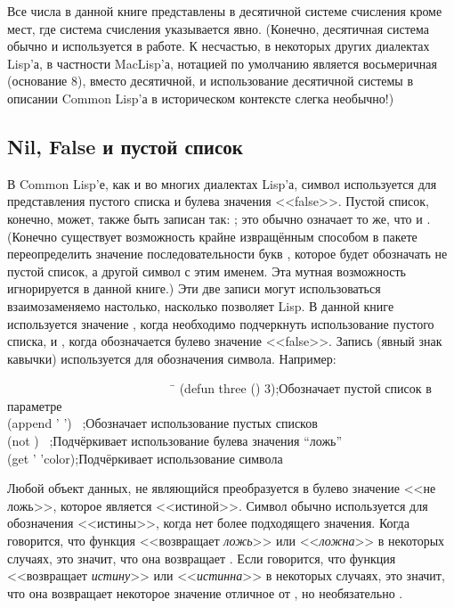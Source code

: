 Все числа в данной книге представлены в десятичной системе счисления кроме мест,
где система счисления указывается явно. 
(Конечно, десятичная система обычно и используется в работе.
К несчастью, в некоторых других диалектах Lisp'а, в частности MacLisp'а,
нотацией по умолчанию является восьмеричная (основание 8), вместо десятичной, и
использование десятичной системы в описании Common Lisp'а в историческом
контексте слегка необычно!) 

\subsection{Nil, False и пустой список}

В Common Lisp'е, как и во многих диалектах Lisp'а, символ  используется
для представления пустого списка и булева значения <<false>>. Пустой список,
конечно, может, также быть записан так: \cd{()}; это обычно означает то же, что
и .
(Конечно существует возможность крайне извращённым способом в пакете
переопределить значение последовательности букв , которое будет 
обозначать не пустой список, а другой символ с этим именем. Эта мутная
возможность игнорируется в данной книге.)
Эти две записи могут использоваться взаимозаменяемо настолько, насколько
позволяет Lisp. В данной книге используется значение {\emptylist}, когда необходимо
подчеркнуть использование пустого списка, и {\false}, когда обозначается булево
значение <<false>>. Запись  (явный знак кавычки) используется для
обозначения символа.
Например:
\begin{lisp}
~~~~~~~~~~~~~~~~~~~~~~~~~~~\=\kill
(defun three () 3)\>;\textrm{Обозначает пустой список в параметре} \\
(append '{\emptylist} '{\emptylist}) \EV\ {\emptylist}\>;\textrm{Обозначает использование
пустых списков} \\
(not {\false}) \EV\ {\true}\>;\textrm{Подчёркивает использование булева значения ``ложь''} \\
(get '{\nil} 'color)\>;\textrm{Подчёркивает использование символа}
\end{lisp}

Любой объект данных, не являющийся {\false} преобразуется в булево значение
<<не ложь>>, которое является <<истиной>>. Символ {\true} обычно используется для
обозначения <<истины>>, когда нет более подходящего значения.
Когда говорится, что функция <<возвращает \emph{ложь}>> или <<\emph{ложна}>>
в некоторых случаях, это значит, что она возвращает {\false}.
Если говорится, что функция <<возвращает \emph{истину}>> или
<<\emph{истинна}>> в некоторых случаях, это значит, что она возвращает некоторое
значение отличное от {\false}, но необязательно {\true}.

